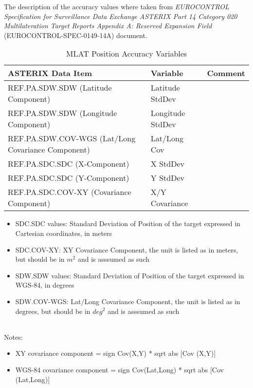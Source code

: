 The description of the accuracy values where taken from \textit{EUROCONTROL Specification for Surveillance Data Exchange ASTERIX Part 14 Category 020 Multilateration Target Reports Appendix A: Reserved Expansion Field} (EUROCONTROL-SPEC-0149-14A) document.

\begin{center}
 \begin{table}[H]
  \begin{tabularx}{\textwidth}{ | X | l | l | }
    \hline
    \textbf{ASTERIX Data Item} & \textbf{Variable} & \textbf{Comment} \\ \hline
     REF.PA.SDW.SDW (Latitude Component) & Latitude StdDev &  \\ \hline
     REF.PA.SDW.SDW (Longitude Component) & Longitude StdDev  &  \\ \hline
     REF.PA.SDW.COV-WGS (Lat/Long Covariance Component) & Lat/Long Cov  &  \\ \hline
     REF.PA.SDC.SDC (X-Component) & X StdDev &  \\ \hline
     REF.PA.SDC.SDC (Y-Component) & Y StdDev  &  \\ \hline
     REF.PA.SDC.COV-XY (Covariance Component) & X/Y Covariance  &  \\ \hline
\end{tabularx}
  \caption{MLAT Position Accuracy Variables}
\end{table}
\end{center}

\begin{itemize}
\item SDC.SDC values: Standard Deviation of Position of the target expressed in Cartesian coordinates, in meters
\item SDC.COV-XY: XY Covariance Component, the unit is listed as in meters, but should be in $m^2$ and is asssumed as such
\item SDW.SDW values: Standard Deviation of Position of the target expressed in WGS-84, in degrees
\item SDW.COV-WGS: Lat/Long Covariance Component, the unit is listed as in degrees, but should be in $deg^2$ and is asssumed as such
\end{itemize}
\ \\

Notes:
\begin{itemize}
\item XY covariance component = sign {Cov(X,Y)} * sqrt {abs [Cov (X,Y)]}
\item WGS-84 covariance component = sign {Cov(Lat,Long)} * sqrt {abs [Cov (Lat,Long)]}
\end{itemize}

